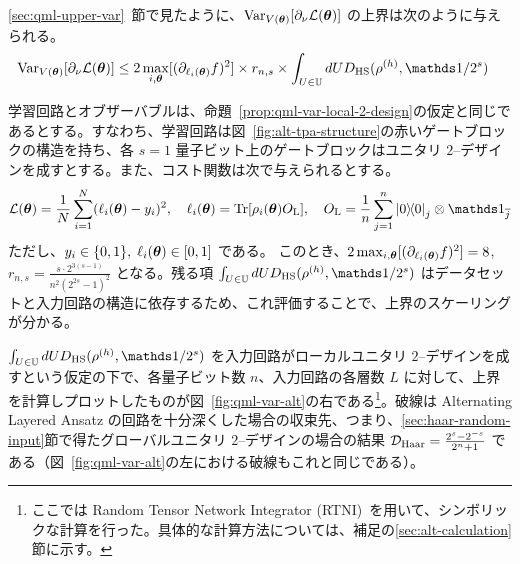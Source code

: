 
\ref{sec:qml-upper-var}~節で見たように、$\operatorname{Var}_{V(\boldsymbol{\theta})}[\partial_\nu \mathcal{L}(\boldsymbol{\theta})]$ の上界は次のように与えられる。
\begin{align*}
    \Var_{V(\bs{\th})}[\pd_\nu \calL(\bs{\th})]
    &\leq
    2\max_{i,\bs{\th}} [(\pd_{\ell_i(\bs{\th})}f)^2]
    \times r_{n,s} \times
    \int_{U\in\bbU} dU D_{\HS} (\rho^{(h)} , \bbid/2^s)
\end{align*}

学習回路とオブザーバブルは、命題~\ref{prop:qml-var-local-2-design}の仮定と同じであるとする。すなわち、学習回路は図~\ref{fig:alt-tpa-structure}の赤いゲートブロックの構造を持ち、各 $s=1$ 量子ビット上のゲートブロックはユニタリ $2$--デザインを成すとする。また、コスト関数は次で与えられるとする。
\begin{align*}
    \calL(\bs{\th}) = \frac1N \sum_{i=1}^N (\ell_i(\bs{\th}) - y_i)^2, \quad
    \ell_i(\bs{\th}) = \Tr[\rho_i(\bs{\th}) O_\rmL], \quad
    O_\rmL = \frac{1}{n} \sum_{j=1}^{n}\dyad{0}_{j} \otimes \bbid_{\bar{j}}
\end{align*}
ただし、$y_i \in \{0,1\},\; \ell_i(\boldsymbol{\theta}) \in [0,1]$ である。
このとき、$2\max_{i,\boldsymbol{\theta}} [(\partial_{\ell_i(\boldsymbol{\theta})}f)^2] = 8$, $r_{n,s} = \frac{s\cdot 2^{3(s-1)}}{n^2(2^{2s}-1)^2}$ となる。残る項 $\int_{U\in\bbU} dU D_{\HS} (\rho^{(h)} , \bbid/2^s)$ はデータセットと入力回路の構造に依存するため、これ評価することで、上界のスケーリングが分かる。


$\int_{U\in\bbU} dU D_{\HS} (\rho^{(h)} , \bbid/2^s)$ を入力回路がローカルユニタリ $2$--デザインを成すという仮定の下で、各量子ビット数 $n$、入力回路の各層数 $L$ に対して、上界を計算しプロットしたものが図~\ref{fig:qml-var-alt}の右である\footnote{ここでは Random Tensor Network Integrator (RTNI)~\cite{fukuda2019rtni}を用いて、シンボリックな計算を行った。具体的な計算方法については、補足の\ref{sec:alt-calculation}節に示す。}。破線は Alternating Layered Ansatz の回路を十分深くした場合の収束先、つまり、\ref{sec:haar-random-input}節で得たグローバルユニタリ $2$--デザインの場合の結果 $\mathcal{D}_{\mathrm{Haar}} = \frac{2^s - 2^{-s}}{2^n + 1}$ である（図~\ref{fig:qml-var-alt}の左における破線もこれと同じである）。

